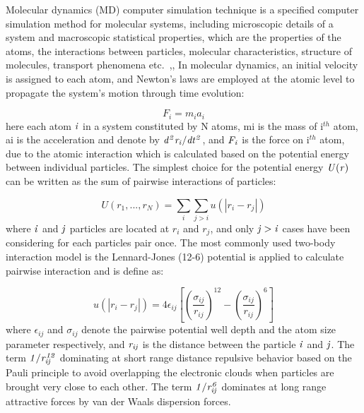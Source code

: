 \documentclass[conference,final]{IEEEtran}
\begin{document}
Molecular dynamics (MD) computer simulation technique is a specified computer simulation method for molecular systems, including microscopic details of a system and macroscopic statistical properties, which are the properties of the atoms, the interactions between particles, molecular characteristics, structure of molecules, transport phenomena etc.~\cite{Allen},\cite{Haile},\cite{Rapaport} In molecular dynamics, an initial velocity is assigned to each atom, and Newton's laws are employed at the atomic level to propagate the system's motion through time evolution:

\vspace{-.2em}
\begin{equation}
F_{i} = m_{i}a_{i}
\label{eq:Newton}
\end{equation}
\normalsize
here each atom $\it i $ in a system constituted by N atoms, mi is the mass of i$^{th}$ atom, ai is the acceleration and denote by $\it {d^2r_{i}} / {dt^2}$, and $\it F_{i}$ is the force on i$^{th}$ atom, due to the atomic interaction which is calculated based on the potential energy between individual particles.
The simplest choice for the potential energy $\it U(r)$  can be written as the sum of pairwise interactions of particles:

\vspace{-.2em}
\begin{equation}
U(r_{1}, ...  ,r_{N}) =  \displaystyle\sum_{i} \displaystyle\sum_{j>i}  u(|r_{i} - r_{j}|)
\label{eq:PEnergy}
\end{equation}
\normalsize
where $\it i$ and $\it j$ particles are located at $r_{i}$ and $r_{j}$, and only $\it j>i$ cases have been considering for each particles pair once.
The most commonly used two-body interaction model is the Lennard-Jones (12-6) potential is applied to calculate pairwise interaction and is define as:

\vspace{-.2em}
\begin{equation}
 u(|r_{i} - r_{j}|) = 4\epsilon_{ij}[(\frac{\sigma_{ij}}{r_{ij}})^{12}-(\frac{\sigma_{ij}}{r_{ij}})^{6}]
 \label{eq:LJ12}
\end{equation}
\normalsize
where $\epsilon_{ij}$ and $\sigma_{ij}$ denote the pairwise potential well depth and the atom size parameter respectively, and $\it r_{ij}$ is the distance between the particle $\it i$ and $\it j$.
The term $\it 1/r_{ij}^{12}$ dominating at short range distance repulsive behavior based on the Pauli principle to avoid overlapping the electronic clouds when particles are  brought very close to each other. The term $\it 1/r_{ij}^6$ dominates at long range attractive forces by van der Waals dispersion forces.
\end{document}
